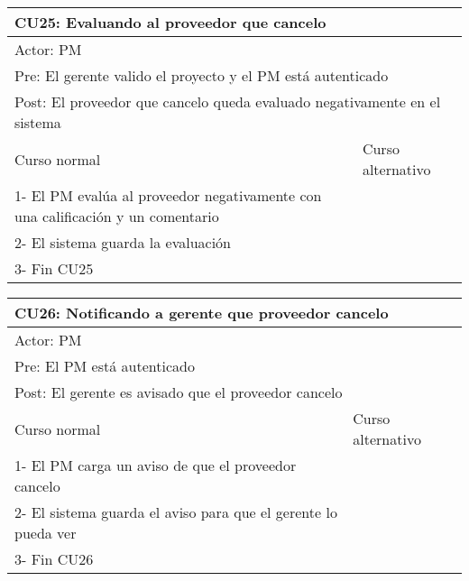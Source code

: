\begin{table}[H]
  \begin{adjustbox}{max width = \textwidth}
  \begin{tabular}{|l|l|}
    \hline
    \multicolumn{2}{|l|}{CU25: Evaluando al proveedor que cancelo} \\\hline
    \multicolumn{2}{|l|}{Actor: PM} \\\hline
    \multicolumn{2}{|l|}{Pre: El gerente valido el proyecto y el PM está autenticado} \\\hline
    \multicolumn{2}{|l|}{Post: El proveedor que cancelo queda evaluado negativamente en el sistema} \\\hline
     Curso normal & Curso alternativo\\ \hline
     1- El PM evalúa al proveedor negativamente con una calificación y un comentario & \\ \hline
  	 2- El sistema guarda la evaluación & \\ \hline
     3- Fin CU25 & \\ \hline
 \end{tabular}
  \end{adjustbox}
\end{table}

\begin{table}[H]
  \begin{adjustbox}{max width = \textwidth}
  \begin{tabular}{|l|l|}
    \hline
    \multicolumn{2}{|l|}{CU26: Notificando a gerente que proveedor cancelo} \\\hline
    \multicolumn{2}{|l|}{Actor: PM} \\\hline
    \multicolumn{2}{|l|}{Pre: El PM está autenticado} \\\hline
    \multicolumn{2}{|l|}{Post: El gerente es avisado que el proveedor cancelo} \\\hline
     Curso normal & Curso alternativo\\ \hline
     1- El PM carga un aviso de que el proveedor cancelo & \\ \hline
  	 2- El sistema guarda el aviso para que el gerente lo pueda ver & \\ \hline
     3- Fin CU26 & \\ \hline
 \end{tabular}
  \end{adjustbox}
\end{table}


